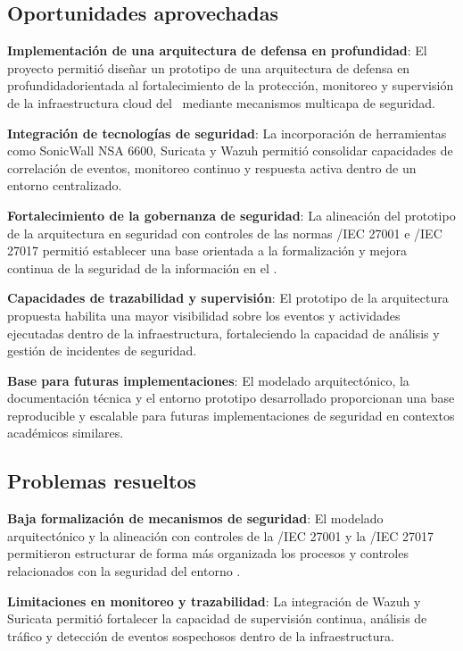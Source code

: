 \subsection{Oportunidades aprovechadas}
\noindent

\textbf{Implementación de una arquitectura de defensa en profundidad}: El proyecto permitió diseñar un prototipo de una arquitectura de 
defensa en profundidadorientada al fortalecimiento de la protección, monitoreo y supervisión de la infraestructura cloud del \GRID\ 
mediante mecanismos multicapa de seguridad.

\textbf{Integración de tecnologías de seguridad}: La incorporación de herramientas como SonicWall NSA 6600, Suricata y Wazuh permitió 
consolidar capacidades de correlación de eventos, monitoreo continuo y respuesta activa dentro de un entorno centralizado.

\textbf{Fortalecimiento de la gobernanza de seguridad}: La alineación del prototipo de la arquitectura en seguridad con controles de las 
normas \ISO/IEC 27001 e \ISO/IEC 27017 permitió establecer una base orientada a la formalización y mejora continua de la seguridad de la 
información en el \GRID.

\textbf{Capacidades de trazabilidad y supervisión}: El prototipo de la arquitectura propuesta habilita una mayor visibilidad sobre los 
eventos y actividades ejecutadas dentro de la infraestructura, fortaleciendo la capacidad de análisis y gestión de incidentes de seguridad.

\textbf{Base para futuras implementaciones}: El modelado arquitectónico, la documentación técnica y el entorno prototipo desarrollado 
proporcionan una base reproducible y escalable para futuras implementaciones de seguridad en contextos académicos similares.

\subsection{Problemas resueltos}
\noindent

\textbf{Baja formalización de mecanismos de seguridad}: El modelado arquitectónico y la alineación con controles de la \ISO/IEC 27001 y la
\ISO/IEC 27017 permitieron estructurar de forma más organizada los procesos y controles relacionados con la seguridad del entorno \GRID.

\textbf{Limitaciones en monitoreo y trazabilidad}: La integración de Wazuh y Suricata permitió fortalecer la capacidad de supervisión 
continua, análisis de tráfico y detección de eventos sospechosos dentro de la infraestructura.

